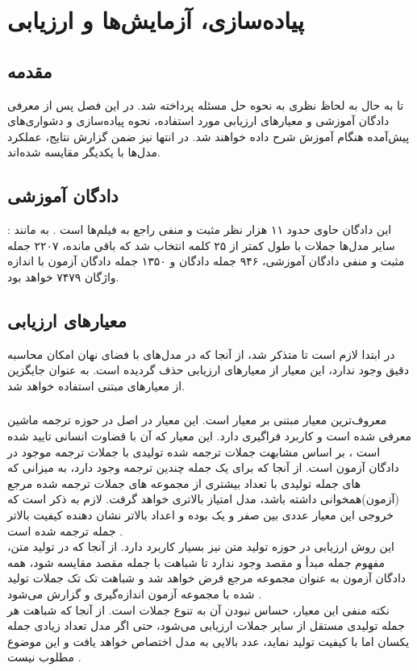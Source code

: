 \chapter{پیاده‌سازی، آزمایش‌ها و ارزیابی}\label{chap4}
\minitoc
\section{مقدمه}
تا به حال به لحاظ نظری به نحوه حل مسئله پرداخته شد. در این فصل پس از معرفی دادگان آموزشی و معیارهای ارزیابی مورد استفاده، نحوه پیاده‌سازی و دشواری‌های پیش‌آمده هنگام آموزش شرح داده خواهند شد. در انتها نیز ضمن گزارش نتایج، عملکرد مدل‌ها با یکدیگر مقایسه شده‌اند.
\section{دادگان آموزشی} \label{chap4:dataset}
:
این دادگان حاوی حدود ۱۱ هزار نظر مثبت و منفی راجع به فیلم‌ها است \cite{sst}. به مانند سایر مدل‌ها جملات با طول کمتر از ۲۵ کلمه انتخاب شد که باقی مانده، ۲۲۰۷ جمله مثبت و منفی دادگان آموزشی، ۹۴۶ جمله دادگان \validation{} و ۱۳۵۰ جمله دادگان آزمون با اندازه واژگان ۷۴۷۹ خواهد بود.

\section{معیارهای ارزیابی} \label{chap4:metrics}
در ابتدا لازم است تا متذکر شد، از آنجا که در مدل‌های با فضای نهان امکان محاسبه دقیق \likelihood{} وجود ندارد، این معیار از معیارهای ارزیابی حذف گردیده است. به عنوان جایگزین از معیار‌های مبتنی \ngramphrase{} استفاده خواهد شد.
\subsection{\bleu{}}
معروف‌ترین معیار مبتنی بر \ngramphrase{} معیار \bleu{} است. این معیار در اصل در حوزه ترجمه ماشین معرفی شده است و کاربرد فراگیری دارد. این معیار که
آن با قضاوت انسانی تایید شده است \cite{bleu}، بر اساس مشابهت \ngramphrase{} جملات ترجمه شده تولیدی با جملات ترجمه موجود در دادگان آزمون است. از آنجا که برای یک جمله چندین ترجمه وجود دارد، به میزانی که \ngramphrase{}‌های جمله تولیدی با تعداد بیشتری از مجموعه \ngram{}‌های جملات ترجمه شده مرجع (آزمون)‌همخوانی داشته باشد، مدل امتیاز بالا‌تری خواهد گرفت. لازم به ذکر است که خروجی این معیار عددی بین صفر و یک بوده و اعداد بالاتر نشان دهنده کیفیت بالاتر جمله ترجمه شده است \cite{bleu}.
\\
این روش ارزیابی در حوزه تولید متن نیز بسیار کاربرد دارد. از آنجا که در تولید متن، مفهوم جمله مبدأ و مقصد وجود ندارد تا شباهت با جمله مقصد مقایسه شود، همه دادگان آزمون به عنوان مجموعه مرجع فرض خواهد شد و شباهت تک تک جملات تولید شده با مجموعه آزمون اندازه‌گیری و گزارش می‌شود \cite{seqgan}.
\\
نکته منفی این معیار، حساس نبودن آن به تنوع جملات است. از آنجا که شباهت هر جمله تولیدی مستقل از سایر جملات ارزیابی می‌شود، حتی اگر مدل تعداد زیادی جمله یکسان اما با کیفیت تولید نماید، عدد بالایی به مدل اختصاص خواهد یافت و این موضوع مطلوب نیست \cite{jointly}.
